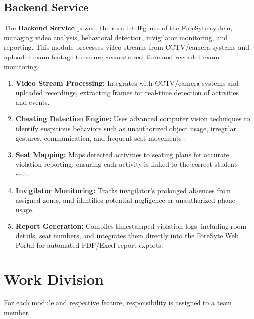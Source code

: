 \subsection{Backend Service}
The \textbf{Backend Service} powers the core intelligence of the ForeSyte system, managing video analysis, behavioral detection, invigilator monitoring, and reporting. 
This module processes video streams from CCTV/camera systems and uploaded exam footage to ensure accurate real-time and recorded exam monitoring.

\begin{enumerate}
    \setlength{\itemsep}{2pt}
    \item \textbf{Video Stream Processing:} Integrates with CCTV/camera systems and uploaded recordings, extracting frames for real-time detection of activities and events.
    \item \textbf{Cheating Detection Engine:} Uses advanced computer vision techniques to identify suspicious behaviors such as unauthorized object usage, irregular gestures, communication, and frequent seat movements \cite{bhatti2023smart, arumugam2025smart_invigilation}.
    \item \textbf{Seat Mapping:} Maps detected activities to seating plans for accurate violation reporting, ensuring each activity is linked to the correct student seat.
    \item \textbf{Invigilator Monitoring:} Tracks invigilator's prolonged absences from assigned zones, and identifies potential negligence or unauthorized phone usage\cite{moyo2023openpose_exam_detection}.
    \item \textbf{Report Generation:} Compiles timestamped violation logs, including room details, seat numbers, and integrates them directly into the ForeSyte Web Portal for automated PDF/Excel report exports.
\end{enumerate}

\section{Work Division}
For each module and respective feature, responsibility is assigned to a team member.

